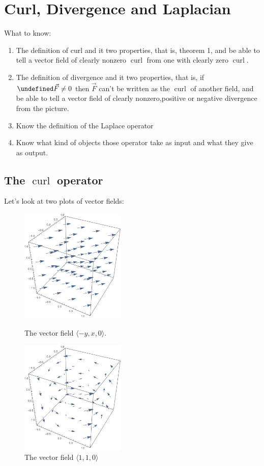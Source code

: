 \documentclass[12pt]{article}
\title{}
\newcommand{\vF}{\vec{F}}
\renewcommand{\lg}{\langle}
\newcommand{\rg}{\rangle}
\DeclareMathOperator{\curl}{curl}
\let \div \undefined
\DeclareMathOperator{\div}{div}
\begin{document}
\section*{Curl, Divergence and Laplacian}
What to know:
\begin{enumerate}
\item The definition of curl and it two properties, that is, theorem 1, and be able to tell a vector field of clearly nonzero $\curl$ from one with clearly zero $\curl$.
\item The definition of divergence and it two properties, that is, if $\div \vF\neq 0$ then  $\vF$ can't be written as the $\curl$ of another field, and be able to tell a vector field of clearly nonzero,positive or negative divergence from the picture.
\item Know the definition of the Laplace operator
\item Know what kind of objects those operator take as input and what they give as output.
\end{enumerate}



\subsection*{The $\curl$ operator}
Let's look at two plots of vector fields:

\begin{figure}[h]
\centering
\parbox{5cm}{
\includegraphics[width=5cm]{noncurly.jpeg}
\caption{The vector field $\lg -y,x,0\rg.$}
\label{fig1}}
\qquad
\begin{minipage}{5cm}
\includegraphics[width=5cm]{curly.jpeg}
\caption{The vector field $\lg 1,1,0\rg$}
\label{fig2}
\end{minipage}
\end{figure}
\end{document}

